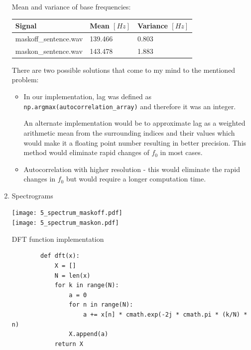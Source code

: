 \documentclass[a4paper, 11pt]{article}
\begin{document}
\begin{enumerate}
        \newpage
        Mean and variance of base frequencies: \\
        \begin{tabular}{ | l | l | l | }
            \hline
            \textbf{Signal}       & \textbf{Mean} $[Hz]$ & \textbf{Variance} $[Hz]$ \\ \hline
            maskoff\_sentence.wav & 139.466              & 0.803                    \\ \hline
            maskon\_sentence.wav  & 143.478              & 1.883                    \\ \hline
        \end{tabular}

        \vspace{2mm}
        There are two possible solutions that come to my mind to the mentioned problem:

        \begin{itemize}
            \item
            In our implementation, lag was defined as \texttt{np.argmax(autocorrelation\_array)} and therefore it was an integer.

            An alternate implementation would be to approximate lag as a weighted arithmetic mean from the surrounding indices and their values
            which would make it a floating point number resulting in better precision.
            This method would eliminate rapid changes of $f_0$ in most cases.

            \item
            Autocorrelation with higher resolution - this would eliminate the rapid changes in $f_0$
            but would require a longer computation time.
        \end{itemize}

        \item
        Spectrograms

        \texttt{[image: 5\_spectrum\_maskoff.pdf]} \\
        \texttt{[image: 5\_spectrum\_maskon.pdf]}

        \newpage

        DFT function implementation

        \begin{verbatim}
        def dft(x):
            X = []
            N = len(x)
            for k in range(N):
                a = 0
                for n in range(N):
                    a += x[n] * cmath.exp(-2j * cmath.pi * (k/N) * n)
                X.append(a)
            return X
        \end{verbatim}


\end{enumerate}
\end{document}
